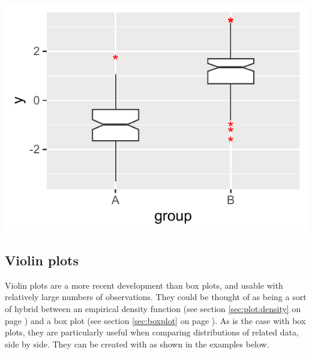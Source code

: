 \documentclass[krantz2]{krantz}\usepackage{knitr}
\begin{document}
\begin{knitrout}\footnotesize
{}\color{fgcolor}\begin{kframe}
\begin{alltt}
  \hlopt{+}
  \hlstd{(} \hlstd{=} \hlstd{,}  \hlstd{=} \hlstd{,}
                \hlstd{=} \hlstd{,}  \hlstd{=} \hlstd{,}  \hlstd{=} \hlstd{)}
\end{alltt}
\end{kframe}

{\centering \includegraphics[width=.54\textwidth]{figure/pos-bw-plot-02-1} 

}



\end{knitrout}


\subsection{Violin plots}\label{sec:plot:violin}

Violin plots are a more recent development than box plots, and usable with relatively large numbers of observations. They could be thought of as being a sort of hybrid between an empirical density function (see section \ref{sec:plot:density} on page \pageref{sec:plot:density}) and a box plot (see section \ref{sec:boxplot} on page \pageref{sec:boxplot}). As is the case with box plots, they are particularly useful when comparing distributions of related data, side by side. They can be created with   as shown in the examples below.

\begin{knitrout}\footnotesize
{}\color{fgcolor}\begin{kframe}
\begin{alltt}
  \hlopt{+}
  \hlstd{()}
\end{alltt}
\end{kframe}
\end{knitrout}
\end{document}
